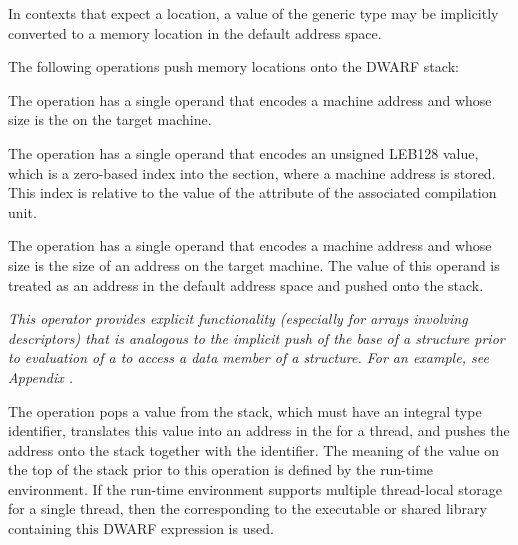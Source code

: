 In contexts that expect a location, a value of the generic type may be
implicitly converted to a memory location in the default address
space.

The following operations push memory locations onto the DWARF stack:

\itembfnl{\DWOPaddrTARG}
The \DWOPaddrNAME{} operation has a single operand that encodes
a machine address and whose size is the 
on the target machine.

\itembfnl{\DWOPaddrxTARG}
The \DWOPaddrxNAME{} operation has a single operand that
encodes an unsigned LEB128 value,
which is a zero-based index into the \dotdebugaddr{} section,
where a machine address is stored.
This index is relative to the value of the
\DWATaddrbase{} attribute of the associated compilation unit.

\itembfnl{\DWOPpushobjectaddressTARG}
The \DWOPpushobjectaddressNAME{} operation has a single operand that
encodes a machine address and whose size is the size of an address on
the target machine. The value of this operand is treated as an address
in the default address space and pushed onto the stack.

\textit{This operator provides explicit functionality
(especially for arrays involving descriptors) that is analogous
to the implicit push of the base
of a structure prior to evaluation of a
\DWATdatamemberlocation{}
to access a data member of a structure. For an example, see
Appendix .}

\itembfnl{\DWOPformtlsaddressTARG}
The \DWOPformtlsaddressNAME{}
operation pops a value from the stack, which must have an
integral type identifier, translates this
value into an address in the
for a thread, and pushes the address
onto the stack together with the \generictype{} identifier.
The meaning of the value on the top of the stack prior to this
operation is defined by the run-time environment.  If the run-time
environment supports multiple thread-local storage
 for a single thread, then the 
corresponding to the executable or shared
library containing this DWARF expression is used.

